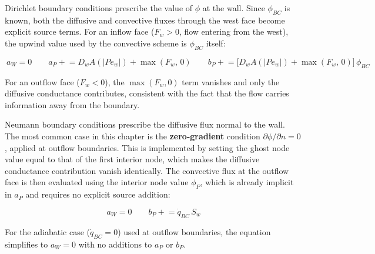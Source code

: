Dirichlet boundary conditions prescribe the value of $\phi$ at the wall. Since $\phi_{BC}$ is known, both the diffusive and convective fluxes through the west face become explicit source terms. For an inflow face ($F_w > 0$, flow entering from the west), the upwind value used by the convective scheme is $\phi_{BC}$ itself:

\begin{equation}~\label{eqConvBCDir}
    a_W = 0 \qquad
    a_P \mathrel{+}= D_w A(|Pe_w|) + \max(F_w,\,0) \qquad
    b_P \mathrel{+}= \bigl[D_w A(|Pe_w|) + \max(F_w,\,0)\bigr]\,\phi_{BC}
\end{equation}

For an outflow face ($F_w < 0$), the $\max(F_w, 0)$ term vanishes and only the diffusive conductance contributes, consistent with the fact that the flow carries information away from the boundary.

Neumann boundary conditions prescribe the diffusive flux normal to the wall. The most common case in this chapter is the \textbf{zero-gradient} condition $\partial \phi / \partial n = 0$, applied at outflow boundaries. This is implemented by setting the ghost node value equal to that of the first interior node, which makes the diffusive conductance contribution vanish identically. The convective flux at the outflow face is then evaluated using the interior node value $\phi_P$, which is already implicit in $a_P$ and requires no explicit source addition:

\begin{equation}~\label{eqConvBCNeu}
    a_W = 0 \qquad
    b_P \mathrel{+}= \dot{q}_{BC}\,S_w
\end{equation}

For the adiabatic case ($\dot{q}_{BC} = 0$) used at outflow boundaries, the equation simplifies to $a_W = 0$ with no additions to $a_P$ or $b_P$.



